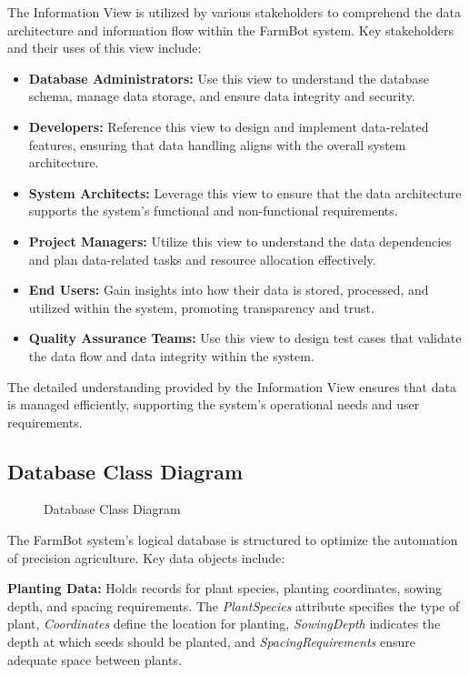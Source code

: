 The Information View is utilized by various stakeholders to comprehend the data architecture and information flow within the FarmBot system. Key stakeholders and their uses of this view include:

\begin{itemize}
    \item \textbf{Database Administrators:} Use this view to understand the database schema, manage data storage, and ensure data integrity and security.
    \item \textbf{Developers:} Reference this view to design and implement data-related features, ensuring that data handling aligns with the overall system architecture.
    \item \textbf{System Architects:} Leverage this view to ensure that the data architecture supports the system's functional and non-functional requirements.
    \item \textbf{Project Managers:} Utilize this view to understand the data dependencies and plan data-related tasks and resource allocation effectively.
    \item \textbf{End Users:} Gain insights into how their data is stored, processed, and utilized within the system, promoting transparency and trust.
    \item \textbf{Quality Assurance Teams:} Use this view to design test cases that validate the data flow and data integrity within the system.
\end{itemize}

The detailed understanding provided by the Information View ensures that data is managed efficiently, supporting the system's operational needs and user requirements.

\subsection{Database Class Diagram}
\begin{figure}[H]
    \centering
    
    \caption{Database Class Diagram}
\end{figure}

The FarmBot system's logical database is structured to optimize the automation of precision agriculture. Key data objects include:

\textbf{Planting Data:} Holds records for plant species, planting coordinates, sowing depth, and spacing requirements. The \textit{PlantSpecies} attribute specifies the type of plant, \textit{Coordinates} define the location for planting, \textit{SowingDepth} indicates the depth at which seeds should be planted, and \textit{SpacingRequirements} ensure adequate space between plants.

